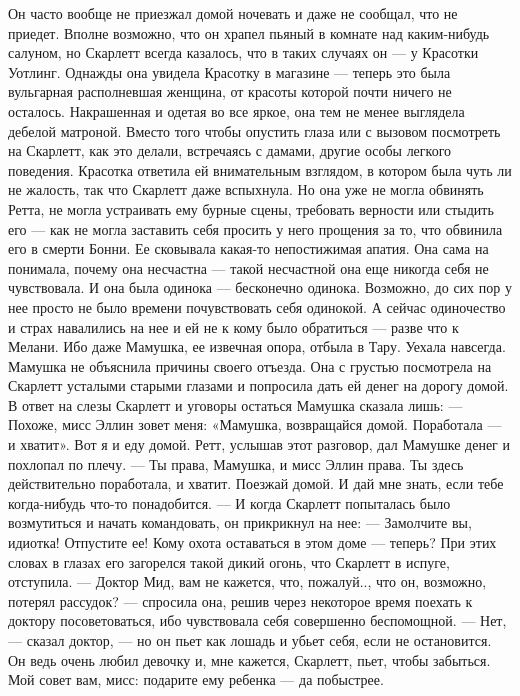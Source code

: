 Он часто вообще не приезжал домой ночевать и даже не сообщал, что не приедет. Вполне возможно, что он храпел пьяный в комнате над каким-нибудь салуном, но Скарлетт всегда казалось, что в таких случаях он — у Красотки Уотлинг. Однажды она увидела Красотку в магазине — теперь это была вульгарная располневшая женщина, от красоты которой почти ничего не осталось. Накрашенная и одетая во все яркое, она тем не менее выглядела дебелой матроной. Вместо того чтобы опустить глаза или с вызовом посмотреть на Скарлетт, как это делали, встречаясь с дамами, другие особы легкого поведения. Красотка ответила ей внимательным взглядом, в котором была чуть ли не жалость, так что Скарлетт даже вспыхнула.
Но она уже не могла обвинять Ретта, не могла устраивать ему бурные сцены, требовать верности или стыдить его — как не могла заставить себя просить у него прощения за то, что обвинила его в смерти Бонни. Ее сковывала какая-то непостижимая апатия. Она сама на понимала, почему она несчастна — такой несчастной она еще никогда себя не чувствовала. И она была одинока — бесконечно одинока. Возможно, до сих пор у нее просто не было времени почувствовать себя одинокой. А сейчас одиночество и страх навалились на нее и ей не к кому было обратиться — разве что к Мелани. Ибо даже Мамушка, ее извечная опора, отбыла в Тару. Уехала навсегда.
Мамушка не объяснила причины своего отъезда. Она с грустью посмотрела на Скарлетт усталыми старыми глазами и попросила дать ей денег на дорогу домой. В ответ на слезы Скарлетт и уговоры остаться Мамушка сказала лишь:
— Похоже, мисс Эллин зовет меня: «Мамушка, возвращайся домой. Поработала — и хватит». Вот я и еду домой.
Ретт, услышав этот разговор, дал Мамушке денег и похлопал по плечу.
— Ты права, Мамушка, и мисс Эллин права. Ты здесь действительно поработала, и хватит. Поезжай домой. И дай мне знать, если тебе когда-нибудь что-то понадобится. — И когда Скарлетт попыталась было возмутиться и начать командовать, он прикрикнул на нее: — Замолчите вы, идиотка! Отпустите ее! Кому охота оставаться в этом доме — теперь?
При этих словах в глазах его загорелся такой дикий огонь, что Скарлетт в испуге, отступила.
— Доктор Мид, вам не кажется, что, пожалуй.., что он, возможно, потерял рассудок? — спросила она, решив через некоторое время поехать к доктору посоветоваться, ибо чувствовала себя совершенно беспомощной.
— Нет, — сказал доктор, — но он пьет как лошадь и убьет себя, если не остановится. Он ведь очень любил девочку и, мне кажется, Скарлетт, пьет, чтобы забыться. Мой совет вам, мисс: подарите ему ребенка — да побыстрее.
